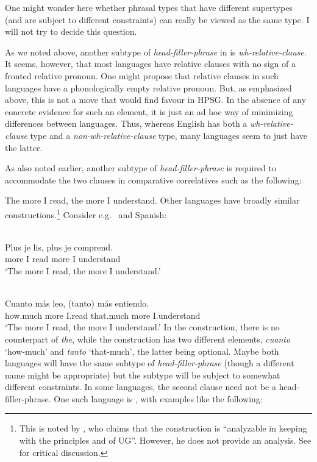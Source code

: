 \documentclass[output=paper]{langsci/langscibook}
\begin{document}
\ea\label{ex:key:4.16}
\z
%
One might wonder here whether phrasal types that have different supertypes (and
are subject to different constraints) can really be viewed as the same type. I
will not try to decide this question.

As we noted above, another subtype of \emph{head-filler-phrase} in  is
\emph{wh-relative-clause}. It seems, however, that most languages have relative
clauses with no sign of a fronted relative pronoun. One might propose that
relative clauses in such languages have a phonologically empty relative
pronoun. But, as emphasized above, this is not a move that would find favour in
\gls{HPSG}. In the absence of any concrete evidence for such an element, it is
just an ad hoc way of minimizing differences between languages. Thus, whereas
English has both a \emph{wh-relative-clause} type and a
\emph{non-wh-relative-clause} type, many languages seem to just have the
latter.

As also noted earlier, another subtype of \emph{head-filler-phrase} is required
to accommodate the two clauses in comparative correlatives such as the
following:

\ea\label{ex:key:4.17}
    The more I read, the more I understand.
\z
%
Other languages have broadly similar constructions.\footnote{This is noted by
    \citet[498]{denDikken2005b}, who claims that the construction is
    \enquote{analyzable in keeping with the principles and  of
    \gls{UG}}.  However, he does not provide an analysis. See
\textcite{AbeBor2008} for critical discussion.} Consider e.g.\  and
Spanish:

\ea\label{ex:key:4.18}\\
    \sn\gll Plus je lis, plus je comprend.\\
            more I read more I understand\\
    \glt    \enquote*{The more I read, the more I understand.}
\z

\ea\label{ex:key:4.19}\\
    \sn\gll Cuanto más leo, (tanto) más entiendo.\\
            how.much more I.read that.much more I.understand\\
    \glt    \enquote*{The more I read, the more I understand.}
\z
%
In the  construction, there is no counterpart of \emph{the}, while
the  construction has two different elements, \emph{cuanto} ‘how-much’
and \emph{tanto} ‘that-much’, the latter being optional. Maybe both languages
will have the same subtype of \emph{head-filler-phrase} (though a different
name might be appropriate) but the subtype will be subject to somewhat
different constraints. In some languages, the second clause need not be a
head-filler-phrase. One such language is , with examples like the
following:
\end{document}
